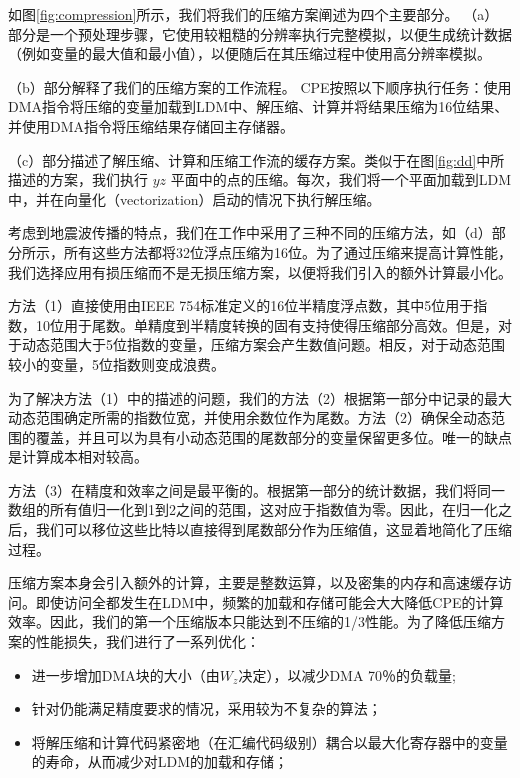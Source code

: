 \documentclass[degree=doctor]{thuthesis}
\begin{document}
如图\ref{fig:compression}所示，我们将我们的压缩方案阐述为四个主要部分。 （a）部分是一个预处理步骤，它使用较粗糙的分辨率执行完整模拟，以便生成统计数据（例如变量的最大值和最小值），以便随后在其压缩过程中使用高分辨率模拟。

（b）部分解释了我们的压缩方案的工作流程。 CPE按照以下顺序执行任务：使用DMA指令将压缩的变量加载到LDM中、解压缩、计算并将结果压缩为16位结果、并使用DMA指令将压缩结果存储回主存储器。

（c）部分描述了解压缩、计算和压缩工作流的缓存方案。类似于在图\ref{fig:dd}中所描述的方案，我们执行 $ yz $ 平面中的点的压缩。每次，我们将一个平面加载到LDM中，并在向量化（vectorization）启动的情况下执行解压缩。

考虑到地震波传播的特点，我们在工作中采用了三种不同的压缩方法，如（d）部分所示，所有这些方法都将32位浮点压缩为16位。为了通过压缩来提高计算性能，我们选择应用有损压缩而不是无损压缩方案，以便将我们引入的额外计算最小化。

方法（1）直接使用由IEEE 754标准定义的16位半精度浮点数，其中5位用于指数，10位用于尾数。单精度到半精度转换的固有支持使得压缩部分高效。但是，对于动态范围大于5位指数的变量，压缩方案会产生数值问题。相反，对于动态范围较小的变量，5位指数则变成浪费。

为了解决方法（1）中的描述的问题，我们的方法（2）根据第一部分中记录的最大动态范围确定所需的指数位宽，并使用余数位作为尾数。方法（2）确保全动态范围的覆盖，并且可以为具有小动态范围的尾数部分的变量保留更多位。唯一的缺点是计算成本相对较高。

方法（3）在精度和效率之间是最平衡的。根据第一部分的统计数据，我们将同一数组的所有值归一化到1到2之间的范围，这对应于指数值为零。因此，在归一化之后，我们可以移位这些比特以直接得到尾数部分作为压缩值，这显着地简化了压缩过程。

压缩方案本身会引入额外的计算，主要是整数运算，以及密集的内存和高速缓存访问。即使访问全都发生在LDM中，频繁的加载和存储可能会大大降低CPE的计算效率。因此，我们的第一个压缩版本只能达到不压缩的1/3性能。为了降低压缩方案的性能损失，我们进行了一系列优化：

\begin{itemize}
  \item 进一步增加DMA块的大小（由$ W_z $决定），以减少DMA 70％的负载量; 
  \item 针对仍能满足精度要求的情况，采用较为不复杂的算法；
  \item 将解压缩和计算代码紧密地（在汇编代码级别）耦合以最大化寄存器中的变量的寿命，从而减少对LDM的加载和存储；
\end{itemize}
\end{document}
